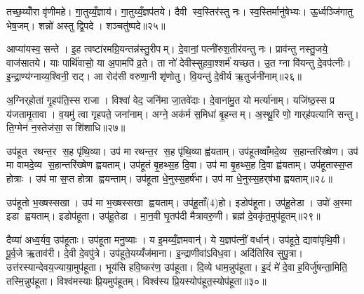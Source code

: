 तच्छ॒य्योँरा वृ॑णीमहे। गा॒तुय्यँ॒ज्ञाय॑। गा॒तुय्यँ॒ज्ञप॑तये। दैवी स्व॒स्तिर॑स्तु नः। स्व॒स्तिर्मानु॑षेभ्यः। ऊ॒र्ध्वञ्जि॑गातु भेष॒जम्। शन्नो॑ अस्तु द्वि॒पदे। शञ्चतु॑ष्पदे॥२५॥\anuvakamend[तच्छ॒य्योँर॒ष्टौ]

आप्या॑यस्व॒ सन्ते। इ॒ह त्वष्टा॑रमग्रि॒यन्तन्न॑स्तु॒रीपम्। दे॒वानां॒ पत्नी॑रुश॒तीर॑वन्तु नः। प्राव॑न्तु नस्तु॒जये॒ वाज॑सातये। याः पार्थि॑वासो॒ या अ॒पामपि॑ व्र॒ते। ता नो॑ देवीस्सुहवा॒श्शर्म॑ यच्छत। उ॒त ग्ना वि॑यन्तु दे॒वप॑त्नीः। इ॒न्द्रा॒ण्य॑ग्नाय्य॒श्विनी॒ राट्। आ रोद॑सी वरुणा॒नी शृ॑णोतु। वि॒यन्तु॑ दे॒वीर्य ऋ॒तुर्जनी॑नाम्॥२६॥

अ॒ग्निर्‌होता॑ गृ॒हप॑ति॒स्स राजा। विश्वा॑ वेद॒ जनि॑मा जा॒तवे॑दाः। दे॒वाना॑मु॒त यो मर्त्या॑नाम्। यजि॑ष्ठ॒स्स प्र य॑जतामृ॒तावा। व॒यमु॑ त्वा गृहपते॒ जना॑नाम्। अग्ने॒ अक॑र्म स॒मिधा॑ बृ॒हन्तम्। अ॒स्थू॒रि णो॒ गार्‌ह॑पत्यानि सन्तु। ति॒ग्मेन॑ न॒स्तेज॑सा॒ सशि॑शाधि॥२७॥\anuvakamend[जनी॑नाम॒ष्टौ च॑]

उप॑हूत रथन्त॒र स॒ह पृ॑थि॒व्या। उप॑ मा रथन्त॒र स॒ह पृ॑थि॒व्या ह्व॑यताम्। उप॑हूतव्वाँमदे॒व्य स॒हान्तरि॑ख्षेण। उप॑ मा वामदे॒व्य स॒हान्तरि॑ख्षेण ह्वयताम्। उप॑हूतं बृ॒हथ्स॒ह दि॒वा। उप॑ मा बृ॒हथ्स॒ह दि॒वा ह्व॑यताम्। उप॑हूतास्स॒प्त होत्राः। उप॑ मा स॒प्त होत्रा ह्वयन्ताम्। उप॑हूता धे॒नुस्स॒हर्ष॑भा। उप॑ मा धे॒नुस्स॒हर्‌ष॑भा ह्वयताम्॥२८॥

उप॑हूतो भ॒ख्षस्सखा। उप॑ मा भ॒ख्षस्सखा ह्वयताम्। उप॑हू॒ताँ(4)हो। इडोप॑हूता। उप॑हू॒तेडा। उपो॑ अ॒स्मा इडा ह्वयताम्। इडोप॑हूता। उप॑हू॒तेडा। मा॒न॒वी घृ॒तप॑दी मैत्रावरु॒णी। ब्रह्म॑ दे॒वकृ॑त॒मुप॑हूतम्॥२९॥

दैव्या॑ अध्व॒र्यव॒ उप॑हूताः। उप॑हूता मनु॒ष्याः। य इ॒मय्यँ॒ज्ञमवान्॑। ये य॒ज्ञप॑त्नीं॒ वर्धान्॑। उप॑हूते॒ द्यावा॑पृथि॒वी। पू॒र्व॒जे ऋ॒ताव॑री। दे॒वी दे॒वपु॑त्रे। उप॑हूते॒यय्यँज॑माना। इ॒न्द्राणीवा॑ऽविध॒वा। अदि॑तिरिव सुपु॒त्रा। उत्त॑रस्यान्देवय॒ज्याया॒मुप॑हूता। भूय॑सि हवि॒ष्कर॑ण॒ उप॑हूता। दि॒व्ये धाम॒न्नुप॑हूता। इ॒दं मे॑ दे॒वा ह॒विर्जु॑षन्ता॒मिति॒ तस्मि॒न्नुप॑हूता। विश्व॑मस्याः प्रि॒यमुप॑हूतम्। विश्व॑स्य प्रि॒यस्योप॑हूत॒स्योप॑हूता॥३०॥



